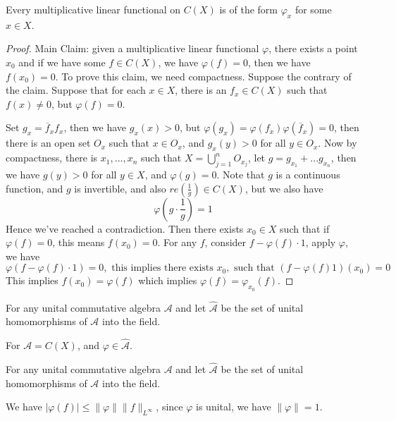 \begin{proposition}
    Every multiplicative linear functional on $C(X)$ is of the form $\varphi_x$ for some $x\in X$.
\end{proposition}
\begin{proof}
    Main Claim: given a multiplicative linear functional $\varphi$, there exists a point $x_0$ and if we have some $f\in C(X)$, we have $\varphi(f)=0$, then we have $f(x_0)=0$. To prove this claim, we need compactness. Suppose the contrary of the claim. Suppose that for each $x\in X$, there is an $f_x\in C(X)$ such that $f(x)\neq 0$, but $\varphi(f)=0$.

    Set $g_x=\overline{f}_xf_x$, then we have $g_x(x)>0$, but $\varphi(g_x)=\varphi(f_x)\varphi(\overline{f}_x)=0$, then there is an open set $O_x$ such that $x\in O_x$, and $g_x(y)>0$ for all $y\in O_x$. Now by compactness, there is $x_1, ..., x_n$ such that $X=\bigcup_{j=1}^nO_{x_j}$, let $g=g_{x_1}+... g_{x_n}$, then we have $g(y)>0$ for all $y\in X$, and $\varphi(g)=0$. Note that $g$ is a continuous function, and $g$ is invertible, and also $re(\frac{1}{g})\in C(X)$, but we also have
    \begin{equation*}
        \varphi \left(g\cdot\frac{1}{g}\right)=1
    \end{equation*}
    Hence we've reached a contradiction.
    Then there exists $x_0\in X$ such that if $\varphi(f)=0$, this means $f(x_0)=0$. For any $f$, consider $f-\varphi(f)\cdot 1$, apply $\varphi$, we have
    \begin{equation*}
        \varphi(f-\varphi(f)\cdot 1)=0, \text{ this implies there exists } x_0, \text{ such that } (f-\varphi(f)1)(x_0)=0
    \end{equation*}
    This implies $f(x_0)=\varphi(f)$ which implies $\varphi(f)=\varphi_{x_0}(f)$.
\end{proof}

For any unital commutative algebra $\mathcal{A}$ and let $\widehat{\mathcal{A}}$ be the set of unital homomorphisms of $\mathcal{A}$ into the field.

For $\mathcal{A}=C(X)$, and $\varphi\in\widehat{\mathcal{A}}$. 
\begin{definition}
    For any unital commutative algebra $\mathcal{A}$ and let $\widehat{\mathcal{A}}$ be the set of unital homomorphisms of $\mathcal{A}$ into the field.
\end{definition}
\begin{remark}
    We have $|\varphi(f)|\leq\|\varphi\|\|f\|_{L^\infty}$, since $\varphi$ is unital, we have $\|\varphi\|=1$.
\end{remark}

